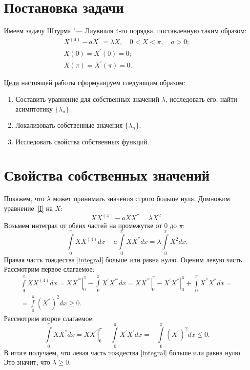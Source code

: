 \documentclass[12pt, a4paper]{article}
\begin{document}
\section{Постановка задачи} 
Имеем задачу Штурма "--- Лиувилля 4-го порядка, поставленную таким образом:
\begin{gather}
X^{(4)} - aX^{''} = \lambda X, \quad 0<X<\pi,\quad a>0;\label{I} \\ 
X(0) = X^{'}(0) = 0;\label{II} \\
X(\pi) = X^{'}(\pi) = 0. \label{III}
\end{gather}

\underline{Цели} настоящей работы сформулируем следующим образом: 
\begin{enumerate}
	\item Составить уравнение для собственных значений $\lambda$, исследовать его, найти асимп\-тотику $\{\lambda_n\}$. 
	\item Локализовать собственные значения $\{\lambda_n\}$. 
	\item Исследовать свойства собственных функций.
\end{enumerate}

\newpage 

\section{Свойства собственных значений}
Покажем, что $\lambda$ может принимать значения строго больше нуля. Домножим урав\-не\-ние~\eqref{I} на $X$:
\[
X X^{(4)} -a X X^{''} = \lambda X^2.
\]
Возьмем интеграл от обеих частей на промежутке от $0$ до $\pi$:
\begin{equation} \label{integral}
\int\limits_0^\pi X X ^{(4)} dx - a\int\limits_0^\pi X X^{''} dx = \lambda \int\limits_0^\pi X^2 dx.
\end{equation}
Правая часть тождества \eqref{integral} больше или равна нулю. Оценим левую часть. Рассмотрим первое слагаемое:
\begin{multline} \label{int1}
\int\limits_0^\pi X X ^{(4)} dx = \left. XX^{'''} \right |_0^\pi - \int\limits_0^\pi X^{'}X^{'''} dx = \left. XX^{'''} \right |_0^\pi - \left. X^{'}X^{''} \right |_0^\pi + \int\limits_0^\pi X^{''}X^{''}dx = \\ = \int\limits_0^\pi (X^{''})^2 dx \ge 0.
\end{multline}
Рассмотрим второе слагаемое:
\begin{equation} \label{int2}
\int\limits_0^\pi XX^{''} dx = \left. XX^{'} \right |_0^\pi - \int\limits_0^\pi X^{'}X^{'} dx = - \int\limits_0^\pi (X^{'})^2 dx \le 0.
\end{equation}
В итоге получаем, что левая часть тождества \eqref{integral} больше или равна нулю. Это значит, что $\lambda \ge 0$.
\end{document}

